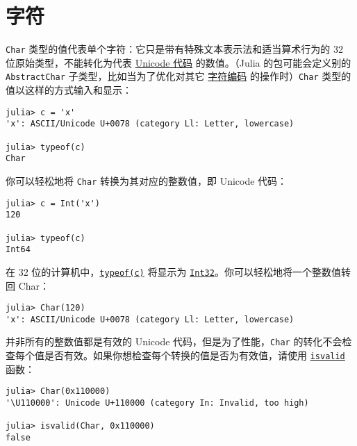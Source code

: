 \hypertarget{11743000381881707413}{}


\section{字符}



\texttt{Char} 类型的值代表单个字符：它只是带有特殊文本表示法和适当算术行为的 32 位原始类型，不能转化为代表 \href{https://en.wikipedia.org/wiki/Code\_point}{Unicode 代码} 的数值。（Julia 的包可能会定义别的 \texttt{AbstractChar} 子类型，比如当为了优化对其它 \href{https://en.wikipedia.org/wiki/Character\_encoding}{字符编码} 的操作时）\texttt{Char} 类型的值以这样的方式输入和显示：




\begin{verbatim}
julia> c = 'x'
'x': ASCII/Unicode U+0078 (category Ll: Letter, lowercase)

julia> typeof(c)
Char
\end{verbatim}



你可以轻松地将 \texttt{Char} 转换为其对应的整数值，即 Unicode 代码：




\begin{verbatim}
julia> c = Int('x')
120

julia> typeof(c)
Int64
\end{verbatim}



在 32 位的计算机中，\hyperlink{13440452181855594120}{\texttt{typeof(c)}} 将显示为 \hyperlink{10103694114785108551}{\texttt{Int32}}。你可以轻松地将一个整数值转回 Char：




\begin{verbatim}
julia> Char(120)
'x': ASCII/Unicode U+0078 (category Ll: Letter, lowercase)
\end{verbatim}



并非所有的整数值都是有效的 Unicode 代码，但是为了性能，\texttt{Char} 的转化不会检查每个值是否有效。如果你想检查每个转换的值是否为有效值，请使用 \hyperlink{9678448882095016755}{\texttt{isvalid}} 函数：




\begin{verbatim}
julia> Char(0x110000)
'\U110000': Unicode U+110000 (category In: Invalid, too high)

julia> isvalid(Char, 0x110000)
false
\end{verbatim}



